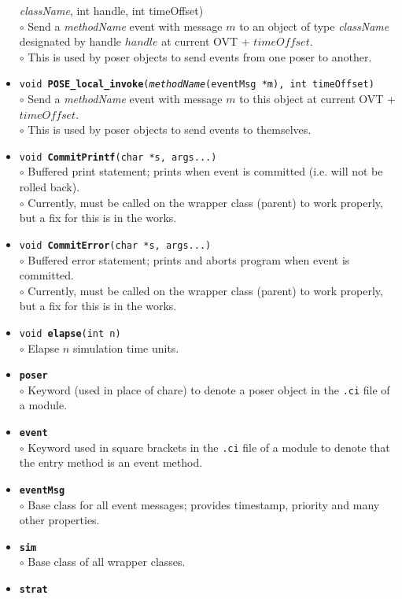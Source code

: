 \begin{itemize}
{{\it className}, int handle, int timeOffset)}\\
	$\circ$ Send a {\it methodName} event with message $m$ to an
	object of type {\it className} designated by handle $handle$
	at current OVT + $timeOffset$.\\
	$\circ$ This is used by poser objects to send events from one
	poser to another.
\item {\tt void {\bf POSE\_local\_invoke}({\it methodName}(eventMsg
	*m), int timeOffset)}\\
	$\circ$ Send a {\it methodName} event with message $m$ to this
	object at current OVT + $timeOffset$.\\
	$\circ$ This is used by poser objects to send events to themselves.
\item {\tt void {\bf CommitPrintf}(char *s, args...)}\\
	$\circ$ Buffered print statement; prints when event is
	committed (i.e. will not be rolled back).\\
	$\circ$ Currently, must be called on the wrapper class
	(parent) to work properly, but a fix for this is in the works.
\item {\tt void {\bf CommitError}(char *s, args...)}\\
	$\circ$ Buffered error statement; prints and aborts program
	when event is committed.\\
	$\circ$ Currently, must be called on the wrapper class
	(parent) to work properly, but a fix for this is in the works.
\item {\tt void {\bf elapse}(int n)}\\
	$\circ$ Elapse $n$ simulation time units.
\item {\tt {\bf poser}}\\
	$\circ$ Keyword (used in place of chare) to denote a poser
	object in the {\tt .ci} file of a \pose{} module.
\item {\tt {\bf event}}\\
	$\circ$ Keyword used in square brackets in the {\tt .ci} file
	of a \pose{} module to denote that the entry method is an event method.
\item {\tt {\bf eventMsg}}\\
	$\circ$ Base class for all event messages; provides timestamp,
	priority and many other properties.
\item {\tt {\bf sim}}\\
	$\circ$ Base class of all wrapper classes.
\item {\tt {\bf strat}}\\

\end{itemize}
